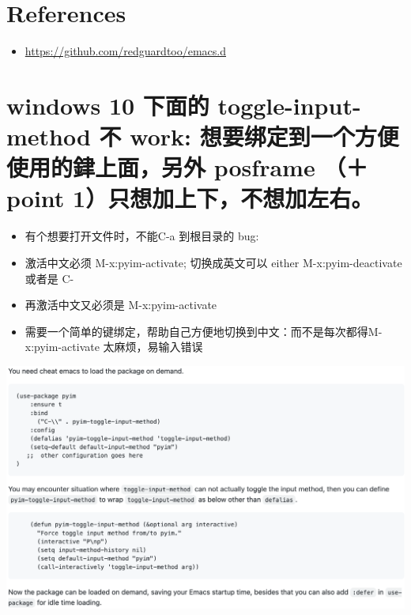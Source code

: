 \documentclass[9pt, b5paper]{article}
\begin{document}
\section{References}
\label{sec-2}
\begin{itemize}
\item \url{https://github.com/redguardtoo/emacs.d}
\end{itemize}

\section{windows 10 下面的 toggle-input-method 不 work: 想要绑定到一个方便使用的銉上面，另外 posframe （＋ point 1）只想加上下，不想加左右。}
\label{sec-3}
\begin{itemize}
\item 有个想要打开文件时，不能C-a 到根目录的 bug:
\item 激活中文必须 M-x:pyim-activate; 切换成英文可以 either M-x:pyim-deactivate 或者是 C-\\
\item 再激活中文又必须是 M-x:pyim-activate
\item 需要一个简单的键绑定，帮助自己方便地切换到中文：而不是每次都得M-x:pyim-activate 太麻烦，易输入错误
\end{itemize}

\includegraphics[width=.9\linewidth]{./pic/readme_20230226_130117.png}
\end{document}
